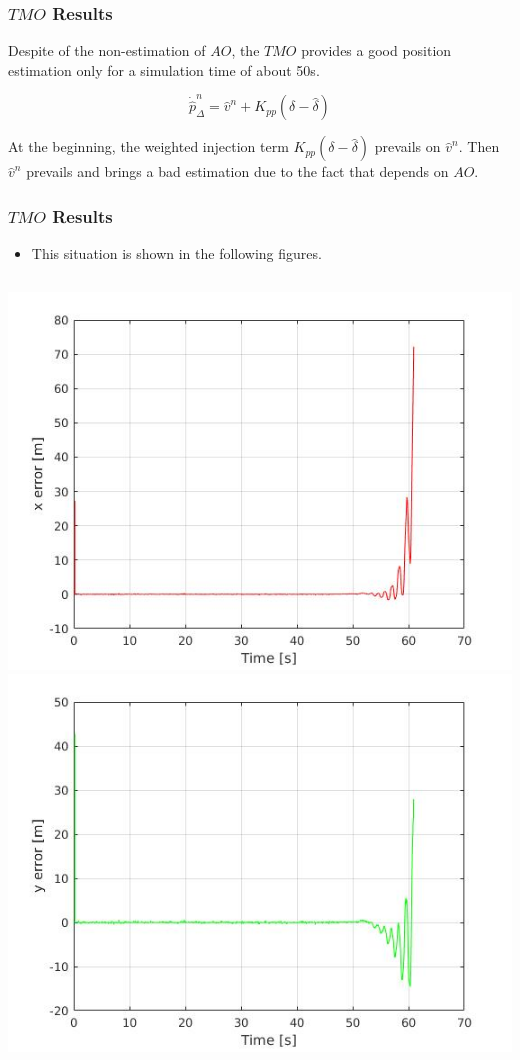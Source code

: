 \documentclass{beamer}
\begin{document}
    \begin{frame}
		\frametitle{$TMO$ Results}
		Despite of the non-estimation of $AO$,
		the $TMO$ provides a good position estimation
		only for a
		simulation time of about 50s.
		
		\[ \dot{\hat{p}}^n_\Delta = \hat{v}^n + K_{pp}(\delta - \hat{\delta})  \]
		
		
		At the beginning, the weighted injection term 
		$K_{pp}(\delta - \hat{\delta})$ prevails on 
		$\hat{v}^n$. Then $\hat{v}^n$ prevails and brings
		a bad estimation due to the fact that depends on
		$AO$.
		
	\end{frame}


   \begin{frame}
		\frametitle{$TMO$ Results}
		\begin{itemize}
		    \item This situation is shown in the following figures.
	    \end{itemize}
		\begin{columns}[t]
			\centering
			\includegraphics[scale=0.2]{x_div}\\
			\includegraphics[scale=0.2]{y_div}

\end{columns}
\end{frame}
\end{document}
